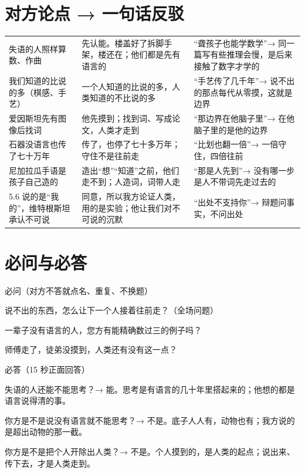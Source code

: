 \documentclass[quick,pro]{debate}
\begin{document}
\section{对方论点 → 一句话反驳}
\begin{tabularx}{\linewidth}{@{}Y Y Y@{}}\toprule
{}&&\\\midrule
失语的人照样算数、作曲&先认能。楼盖好了拆脚手架，楼还在；他们都是先有语言的&“聋孩子也能学数学”→ 同一篇写有些推理会慢，是后来接触了数字才学的\\
我们知道的比说的多（棋感、手艺）&一个人知道的比说的多，人类知道的不比说的多&“手艺传了几千年”→ 说不出的那点每代从零摸，这就是边界\\
爱因斯坦先有图像后找词&他先摸到；找到词、写成论文，人类才走到&“那边界在他脑子里”→ 在他脑子里的是他的边界\\
石器没语言也传了七十万年&传了，也停了七十多万年；守住不是往前走&“比划也翻一倍”→ 一倍守住，四倍往前\\
尼加拉瓜手语是孩子自己造的&造出“想”“知道”之前，他们走不到；人造词，词带人走&“那是人先到”→ 没有哪一步是人不带词先走过去的\\
5.6 说的是“我的”，维特根斯坦承认不可说&同意，所以我方论证人类，用的是实验；他让我们对不可说的沉默&“出处不支持你”→ 辩题问事实，不问出处\\
\bottomrule\end{tabularx}

\section{必问与必答}
\begin{points}{必问（对方不答就点名、重复、不换题）}
\item 说不出的东西，怎么让下一个人接着往前走？（全场问题）
\item 一辈子没有语言的人，您方有能精确数过三的例子吗？
\item 师傅走了，徒弟没摸到，人类还有没有这一点？
\end{points}
\begin{points}{必答（15 秒正面回答）}
\item 失语的人还能不能思考？→ 能。思考是有语言的几十年里搭起来的；他想的都是语言说得清的事。
\item 你方是不是说没有语言就不能思考？→ 不是。底子人人有，动物也有；我方说的是超出动物的那一截。
\item 你方是不是把个人开除出人类？→ 不是。个人摸到的，是人类的起点；说出来、传下去，才是人类走到。
\end{points}
\end{document}

